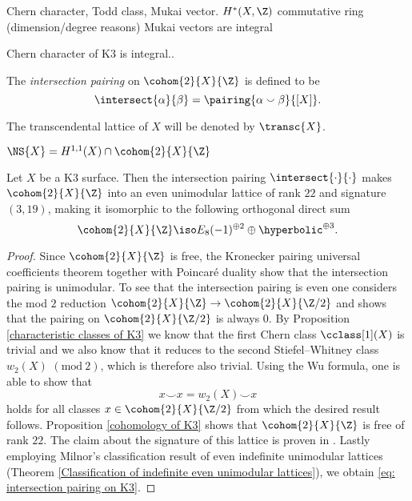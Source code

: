 Chern character, Todd class, Mukai vector. $H^*(X, \Z)$ commutative ring (dimension/degree reasons)
Mukai vectors are integral 

\begin{remark}
    \label{chern character on K3 is integral}
    Chern character of K3 is integral..
\end{remark}


\begin{definition}
    The \emph{intersection pairing} on $\cohom{2}{X}{\Z}$ is defined to be 
    \[
        \intersect{\alpha}{\beta} = \pairing{\alpha \smallsmile \beta}{[X]}.
    \] 
\end{definition}

The transcendental lattice of $X$ will be denoted by $\transc{X}$.

$\NS{X} = H^{1,1}(X) \cap \cohom{2}{X}{\Z}$



\begin{proposition}
    \label{intersection pairing on K3 is even}
    Let $X$ be a K3 surface. Then the intersection pairing $\intersect{\cdot}{\cdot}$ makes $\cohom{2}{X}{\Z}$ into an even unimodular lattice of rank $22$ and signature $(3,19)$, making it isomorphic to the following orthogonal direct sum
    \begin{equation}
        \label{eq: intersection pairing on K3}
        \cohom{2}{X}{\Z} \iso E_8(-1)^{\oplus 2} \oplus \hyperbolic^{\oplus 3}.
    \end{equation}
\end{proposition}

\begin{proof}
    Since $\cohom{2}{X}{\Z}$ is free, the Kronecker pairing universal coefficients theorem together with Poincaré duality show that the intersection pairing is unimodular. To see that the intersection pairing is even one considers the mod $2$ reduction $\cohom{2}{X}{\Z} \to \cohom{2}{X}{\Z/2}$ and shows that the pairing on $\cohom{2}{X}{\Z/2}$ is always $0$. By Proposition \ref{characteristic classes of K3} we know that the first Chern class $\cclass[1](X)$ is trivial and we also know that it reduces to the second Stiefel--Whitney class $w_2(X)$ $\mathrm{(mod \ 2)}$, which is therefore also trivial. Using the Wu formula, one is able to show that
    \[
        x \smallsmile x = w_2(X) \smallsmile x
    \]
    holds for all classes $x \in \cohom{2}{X}{\Z/2}$ from which the desired result follows. Proposition \ref{cohomology of K3} shows that $\cohom{2}{X}{\Z}$ is free of rank $22$. The claim about the signature of this lattice is proven in \cite[\S 1, Proposition 3.5]{Huybrechts2016}. Lastly employing Milnor's classification result of even indefinite unimodular lattices (Theorem \ref{Classification of indefinite even unimodular lattices}), we obtain \eqref{eq: intersection pairing on K3}.
\end{proof}


